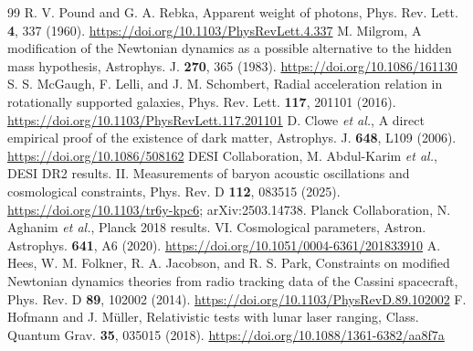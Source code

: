 \documentclass[aps,prd,twocolumn,superscriptaddress,nofootinbib,showkeys]{revtex4-2}
\begin{document}
\begin{thebibliography}{99}
 R. V. Pound and G. A. Rebka, Apparent weight of photons, Phys. Rev. Lett. \textbf{4}, 337 (1960). \url{https://doi.org/10.1103/PhysRevLett.4.337}
 M. Milgrom, A modification of the Newtonian dynamics as a possible alternative to the hidden mass hypothesis, Astrophys. J. \textbf{270}, 365 (1983). \url{https://doi.org/10.1086/161130}
 S. S. McGaugh, F. Lelli, and J. M. Schombert, Radial acceleration relation in rotationally supported galaxies, Phys. Rev. Lett. \textbf{117}, 201101 (2016). \url{https://doi.org/10.1103/PhysRevLett.117.201101}
 D. Clowe \emph{et al.}, A direct empirical proof of the existence of dark matter, Astrophys. J. \textbf{648}, L109 (2006). \url{https://doi.org/10.1086/508162}
 DESI Collaboration, M. Abdul-Karim \emph{et al.}, DESI DR2 results. II. Measurements of baryon acoustic oscillations and cosmological constraints, Phys. Rev. D \textbf{112}, 083515 (2025). \url{https://doi.org/10.1103/tr6y-kpc6}; arXiv:2503.14738.
 Planck Collaboration, N. Aghanim \emph{et al.}, Planck 2018 results. VI. Cosmological parameters, Astron. Astrophys. \textbf{641}, A6 (2020). \url{https://doi.org/10.1051/0004-6361/201833910}
 A. Hees, W. M. Folkner, R. A. Jacobson, and R. S. Park, Constraints on modified Newtonian dynamics theories from radio tracking data of the Cassini spacecraft, Phys. Rev. D \textbf{89}, 102002 (2014). \url{https://doi.org/10.1103/PhysRevD.89.102002}
 F. Hofmann and J. M\"uller, Relativistic tests with lunar laser ranging, Class. Quantum Grav. \textbf{35}, 035015 (2018). \url{https://doi.org/10.1088/1361-6382/aa8f7a}
\end{thebibliography}
\end{document}

